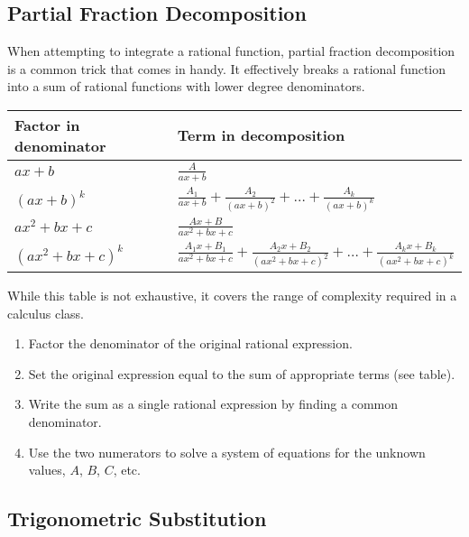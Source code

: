\subsection{Partial Fraction Decomposition}

When attempting to integrate a rational function, partial fraction decomposition is a common trick that comes in handy. It effectively breaks a rational function into a sum of rational functions with lower degree denominators.



\begin{center}
\def\arraystretch{1.5}
\begin{tabular}{@{}ll@{}}
\toprule[0.4mm]
      Factor in denominator & Term in decomposition\\
      \hline
      $ax+b$          & $\frac{A}{ax+b}$ \\
      $(ax+b)^k$      & $\frac{A_1}{ax+b}+\frac{A_2}{(ax+b)^2}+\dots+\frac{A_k}{(ax+b)^k}$ \\
      $ax^2+bx+c$     & $\frac{Ax+B}{ax^2+bx+c}$\\
      $(ax^2+bx+c)^k$ & $\frac{A_1x+B_1}{ax^2+bx+c}+\frac{A_2x+B_2}{(ax^2+bx+c)^2}+\dots+\frac{A_kx+B_k}{(ax^2+bx+c)^k}$ \\
\bottomrule[0.4mm]
    \end{tabular}
\end{center}

While this table is not exhaustive, it covers the range of complexity required in a calculus class.

\begin{strat}
\begin{enumerate}[leftmargin=1em]
  \item Factor the denominator of the original rational expression.
  \item Set the original expression equal to the sum of appropriate terms (see table).
  \item Write the sum as a single rational expression by finding a common denominator.
  \item Use the two numerators to solve a system of equations for the unknown values, $A$, $B$, $C$, etc.
\end{enumerate}
\end{strat}



\subsection{Trigonometric Substitution}


